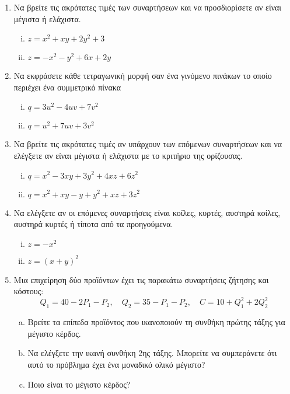 



\everymath{\displaystyle}




\begin{center}
\end{center}

\vspace{\baselineskip}

\begin{enumerate}
\item Να βρείτε τις ακρότατες τιμές των συναρτήσεων και να προσδιορίσετε αν είναι μέγιστα ή ελάχιστα.

\begin{enumerate}[i)]
\item $z=x^2+xy+2y^2+3$
\item $z=-x^2-y^2+6x+2y$
\end{enumerate}


\item Να εκφράσετε κάθε τετραγωνική μορφή σαν ένα γινόμενο πινάκων το οποίο περιέχει ένα συμμετρικό πίνακα

\begin{enumerate}[i)]
\item $q=3u^2-4uv+7v^2$
\item $q=u^2+7uv+3v^2$
\end{enumerate}


\item Να βρείτε τις ακρότατες τιμές αν υπάρχουν των επόμενων συναρτήσεων και να ελέγξετε αν είναι μέγιστα ή ελάχιστα με το κριτήριο της ορίζουσας.

\begin{enumerate}[i)]
\item $q=x^2-3xy+3y^2+4xz+6z^2$
\item $q=x^2+xy-y+y^2+xz+3z^2$
\end{enumerate}


\item Να ελέγξετε αν οι επόμενες συναρτήσεις είναι κοίλες, κυρτές, αυστηρά κοίλες, αυστηρά κυρτές ή τίποτα από τα προηγούμενα.

\begin{enumerate}[i)]
\item $z=-x^2$
\item $z=(x+y)^2$
\end{enumerate}


\item Μια επιχείρηση δύο προϊόντων έχει τις παρακάτω συναρτήσεις ζήτησης και κόστους:
\[
Q_1=40-2P_1-P_2,\quad Q_2=35-P_1-P_2,\quad C=10+Q_1^2+2Q_2^2
\]
\begin{enumerate}[a)]
\item Βρείτε τα επίπεδα προϊόντος που ικανοποιούν τη συνθήκη πρώτης τάξης για μέγιστο κέρδος.
\item Να ελέγξετε την ικανή συνθήκη 2ης τάξης. Μπορείτε να συμπεράνετε ότι αυτό το πρόβλημα έχει ένα μοναδικό ολικό μέγιστο?
\item Ποιο είναι το μέγιστο κέρδος?
\end{enumerate}



\end{enumerate}
